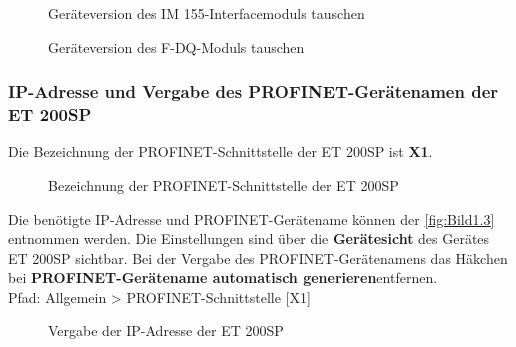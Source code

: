 \begin{figure}[H]
   \centering
   \caption[Geräteversion des IM 155-Interfacemoduls tauschen]{Geräteversion des IM 155-Interfacemoduls tauschen}
   \label{fig:Bild4.6}
\end{figure}

\begin{figure}[H]
   \centering
   \caption[Geräteversion des F-DQ-Moduls tauschen]{Geräteversion des F-DQ-Moduls tauschen}
   \label{fig:Bild4.7}
\end{figure}

\subsubsection{IP-Adresse und Vergabe des PROFINET-Gerätenamen der ET 200SP} \label{sec: IP-Adresse_PROFINET-Gerätename_ET_200SP}
Die Bezeichnung der PROFINET-Schnittstelle der ET 200SP ist \textbf{X1}.

\begin{figure}[H]
   \centering
   \caption[Bezeichnung der PROFINET-Schnitstelle der ET 200SP]{Bezeichnung der PROFINET-Schnittstelle der ET 200SP}
   \label{fig:Bild4.8}
\end{figure}

Die benötigte IP-Adresse und PROFINET-Gerätename können der \autoref{fig:Bild1.3} entnommen werden. Die Einstellungen sind über die \textbf{Gerätesicht} des Gerätes ET 200SP sichtbar. Bei der Vergabe des PROFINET-Gerätenamens das Häkchen bei \glqq\textbf{PROFINET-Gerätename automatisch generieren}\grqq\:entfernen.\\
Pfad: Allgemein > PROFINET-Schnittstelle [X1]

\begin{figure}[H]
   \centering
   \caption[Vergabe der IP-Adresse der ET 200SP]{Vergabe der IP-Adresse der ET 200SP}
   \label{fig:Bild4.9}
\end{figure}

